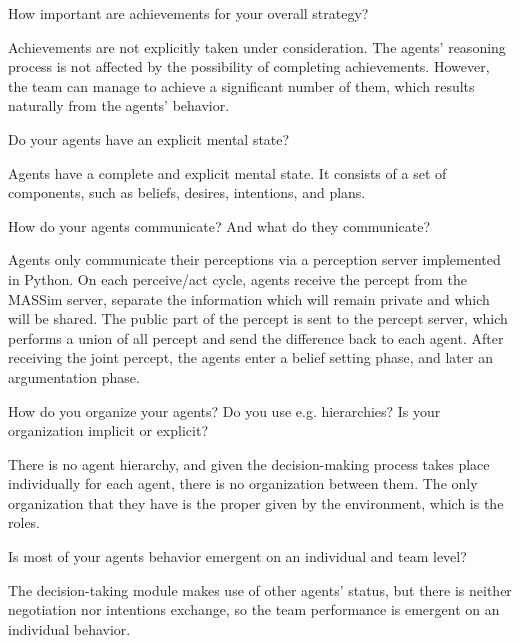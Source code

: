 \begin{question}
How important are achievements for your overall strategy?  
\end{question}

Achievements are not explicitly taken under consideration. The agents'
reasoning process is not affected by the possibility of completing
achievements.    However, the team can manage to achieve a significant number of
them, which results naturally from the agents' behavior. 

\begin{question}
Do your agents have an explicit mental state?
\end{question}

Agents have a complete and explicit mental state. It consists of a set of
components, such as beliefs, desires, intentions, and plans. 

\begin{question}
How do your agents communicate? And what do they communicate?  
\end{question}

Agents only communicate their perceptions via a perception server implemented in
Python.  On each perceive/act cycle, agents receive the percept from the MASSim
server, separate the information which will remain private and which will be
shared.  The public part of the percept is sent to the percept server, which
performs a union of all percept and send the difference back to each agent.
After receiving the joint percept, the agents enter a belief setting phase, and
later an argumentation phase.

\begin{question}
How do you organize your agents? Do you use e.g. hierarchies? Is your
organization implicit or explicit?
\end{question}

There is no agent hierarchy, and given the decision-making process takes place
individually for each agent, there is no organization between them.  The only
organization that they have is the proper given by the environment, which is the
roles.

\begin{question}
Is most of your agents behavior emergent on an individual and team level?
\end{question}

The decision-taking module makes use of other agents' status, but there is
neither negotiation nor intentions exchange, so the team performance is emergent
on an individual behavior.

